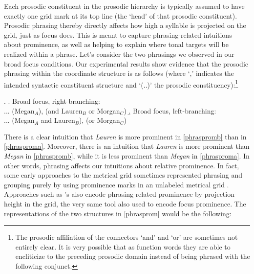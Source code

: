 \documentclass[preprint,review,12pt,authoryear,times]{elsarticle}
\begin{document}
Each prosodic constituent in the prosodic hierarchy is typically assumed  to have exactly one grid mark at its top line (the `head' of that prosodic constituent). Prosodic phrasing thereby directly affects how high a syllable is projected on the grid,  just as focus does. This is meant to capture phrasing-related intuitions about prominence, as well as helping to explain where tonal targets will be realized within a phrase.  Let's consider the two phrasings we observed in our broad focus conditions. Our experimental results show evidence that the prosodic phrasing within the coordinate structure is as follows (where `,' indicates the intended syntactic constituent structure and `(..)' the prosodic constituency):\footnote{The prosodic affiliation of the connectors `and' and `or' are sometimes not entirely clear. It is very possible that as function words they are able to encliticize to the preceding prosodic domain instead of being phrased with the following conjunct.}

\ex.\label{phrasprom}
\a. Broad focus, right-branching:\\
... (Megan$_A$), (and Lauren$_B$ or Morgan$_C$) \label{phrasproma}
\b. Broad focus, left-branching:\\
... (Megan$_A$ and Lauren$_B$), (or Morgan$_C$) \label{phraspromb}

There is a clear intuition that {\em Lauren} is more prominent in \ref{phraspromb} than in \ref{phrasproma}.  Moreover, there is an intuition that {\em Lauren} is more prominent than {\em Megan} in  \ref{phraspromb}, while it is less prominent than {\em Megan} in \ref{phrasproma}. In other words, phrasing affects our intuitions about relative prominence. In fact, some early approaches to the metrical grid sometimes represented phrasing and grouping purely by using prominence marks in an unlabeled metrical grid \citep[e.g.][]{princ83}. Approaches such as \citet{truck95}'s also encode phrasing-related prominence by projection-height in the grid, the very same tool also used to encode focus prominence. The representations of the two structures in \ref{phrasprom} would be the following:
\end{document}
